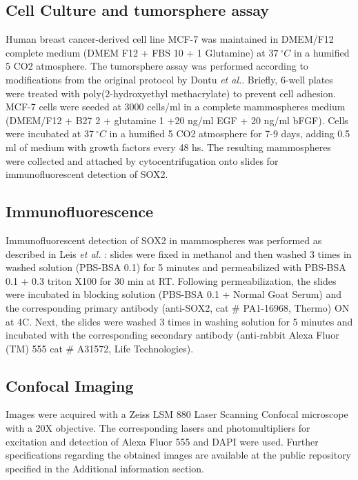 \documentclass[fleqn,10pt]{wlscirep}
\begin{document}
\subsection*{Cell Culture and tumorsphere assay}

Human breast cancer-derived cell line MCF-7 was maintained in DMEM/F12 complete medium (DMEM F12 + FBS 10 + 1 Glutamine) at $37 \ ^{\circ} C$ in a humified 5 CO2 atmosphere. The tumorsphere assay was performed according to modifications \cite{Leis} from the original protocol by Dontu \emph{et al.}\cite{Dontu}. Briefly, 6-well plates were treated with poly(2-hydroxyethyl methacrylate) to prevent cell adhesion. MCF-7 cells were seeded at 3000 cells/ml in a complete mammospheres medium (DMEM/F12 + B27 2 + glutamine 1 +20 ng/ml EGF + 20 ng/ml bFGF). Cells were incubated at $37\ ^{\circ} C$  in a humified 5 CO2 atmosphere for 7-9 days, adding 0.5 ml of medium with growth factors every 48 hs. The resulting mammospheres were collected and attached by cytocentrifugation onto slides for immunofluorescent detection of SOX2.

\subsection*{Immunofluorescence}

Immunofluorescent detection of SOX2 in mammospheres was performed as described in Leis \emph{et al.} \cite{Leis}: slides were fixed in methanol and then washed 3 times in washed solution (PBS-BSA 0.1) for 5 minutes and permeabilized with PBS-BSA 0.1 + 0.3 triton X100 for 30 min at RT. Following permeabilization, the slides were incubated in blocking solution (PBS-BSA 0.1 + Normal Goat Serum) and the corresponding primary antibody (anti-SOX2, cat \# PA1-16968, Thermo)  ON at 4C. Next, the slides were washed 3 times in washing solution for 5 minutes and incubated with the corresponding secondary antibody (anti-rabbit Alexa Fluor (TM) 555 cat \# A31572, Life Technologies).   

\subsection*{Confocal Imaging}

Images were acquired with a Zeiss LSM 880 Laser Scanning Confocal microscope with a 20X objective. The corresponding lasers and photomultipliers for excitation and detection of Alexa Fluor 555 and DAPI were used. Further specifications regarding the obtained images are available at the public repository specified in the Additional information section.
\end{document}

